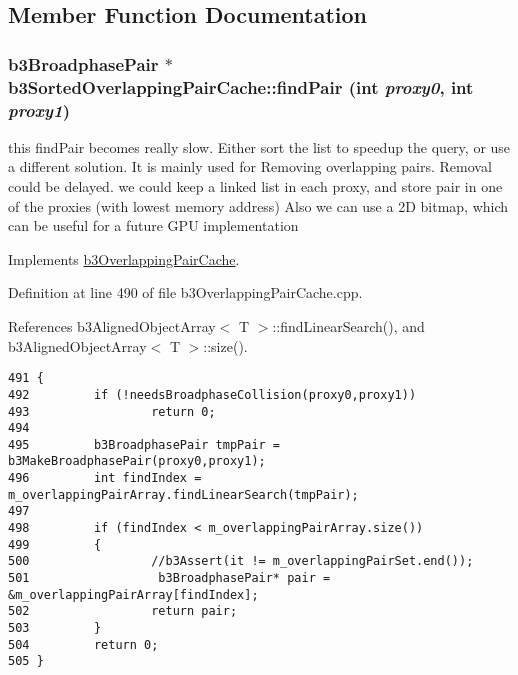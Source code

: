 \subsection{Member Function Documentation}
\hypertarget{classb3_sorted_overlapping_pair_cache_d24f6d5bfc4b9e378ace06bcb10519ea}{
\subsubsection[findPair]{\setlength{\rightskip}{0pt plus 5cm}b3BroadphasePair $\ast$ b3SortedOverlappingPairCache::findPair (int {\em proxy0}, \/  int {\em proxy1})}}
\label{classb3_sorted_overlapping_pair_cache_d24f6d5bfc4b9e378ace06bcb10519ea}


this findPair becomes really slow. Either sort the list to speedup the query, or use a different solution. It is mainly used for Removing overlapping pairs. Removal could be delayed. we could keep a linked list in each proxy, and store pair in one of the proxies (with lowest memory address) Also we can use a 2D bitmap, which can be useful for a future GPU implementation 

Implements \hyperlink{classb3_overlapping_pair_cache}{b3OverlappingPairCache}.

Definition at line 490 of file b3OverlappingPairCache.cpp.

References b3AlignedObjectArray$<$ T $>$::findLinearSearch(), and b3AlignedObjectArray$<$ T $>$::size().

\begin{Code}\begin{verbatim}491 {
492         if (!needsBroadphaseCollision(proxy0,proxy1))
493                 return 0;
494 
495         b3BroadphasePair tmpPair = b3MakeBroadphasePair(proxy0,proxy1);
496         int findIndex = m_overlappingPairArray.findLinearSearch(tmpPair);
497 
498         if (findIndex < m_overlappingPairArray.size())
499         {
500                 //b3Assert(it != m_overlappingPairSet.end());
501                  b3BroadphasePair* pair = &m_overlappingPairArray[findIndex];
502                 return pair;
503         }
504         return 0;
505 }
\end{verbatim}
\end{Code}




